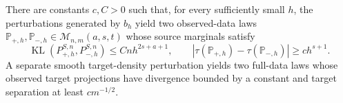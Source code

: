 There are constants \(c,C>0\) such that, for every sufficiently small \(h\), the perturbations generated by \(b_h\) yield two observed-data laws \(\mathbb P_{+,h},\mathbb P_{-,h}\in\mathcal M_{n,m}(a,s,t)\) whose source marginals satisfy \[\operatorname{KL}(P_{+,h}^{S,n},P_{-,h}^{S,n})\le Cnh^{2s+a+1},\qquad |\tau(\mathbb P_{+,h})-\tau(\mathbb P_{-,h})|\ge ch^{s+1}.\] A separate smooth target-density perturbation yields two full-data laws whose observed target projections have divergence bounded by a constant and target separation at least \(cm^{-1/2}\).